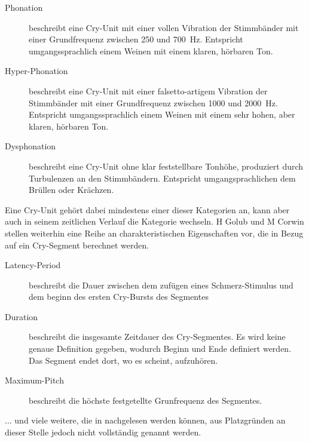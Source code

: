 \begin{description}
	\item[Phonation] beschreibt eine Cry-Unit mit einer \glqq vollen Vibration der Stimmbänder\grqq{} mit einer Grundfrequenz zwischen 250 und \SI{700}{\hertz}. Entspricht umgangssprachlich einem Weinen mit einem \glqq klaren, hörbaren Ton\grqq{}.
	\item[Hyper-Phonation] beschreibt eine Cry-Unit mit einer \glqq falsetto-artigem Vibration der Stimmbänder\grqq{} mit einer Grundfrequenz zwischen 1000 und \SI{2000}{\hertz}. Entspricht umgangssprachlich einem Weinen mit einem \glqq sehr hohen, aber klaren, hörbaren Ton\grqq{}.
	\item[Dysphonation] beschreibt eine Cry-Unit ohne klar feststellbare Tonhöhe, produziert durch Turbulenzen an den Stimmbändern. Entspricht umgangsprachlichen dem \glqq Brüllen oder Krächzen\grqq{}.
\end{description}

Eine Cry-Unit gehört dabei mindestens einer dieser Kategorien an, kann aber auch in seinem zeitlichen Verlauf die Kategorie wechseln. H Golub und M Corwin \cite{cryModel} stellen weiterhin eine Reihe an charakteristischen Eigenschaften vor, die in Bezug auf ein Cry-Segment berechnet werden. 

\begin{description}
	\item[Latency-Period] beschreibt die Dauer zwischen dem zufügen eines Schmerz-Stimulus und dem beginn des ersten Cry-Bursts des Segmentes
	\item[Duration] beschreibt die insgesamte Zeitdauer des Cry-Segmentes. Es wird keine genaue Definition gegeben, wodurch Beginn und Ende definiert werden. Das Segment endet dort, wo es \glqq scheint, aufzuhören\grqq{}.
	\item[Maximum-Pitch] beschreibt die höchste festgetellte Grunfrequenz des Segmentes. 
\end{description}

... und viele weitere, die in \cite{cryModel} nachgelesen werden können, aus Platzgründen an dieser Stelle jedoch nicht vollständig genannt werden.